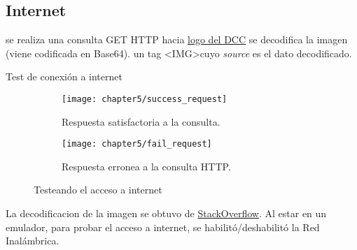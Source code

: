 \subsection*{Internet}
\begin{algorithm}
	\begin{algorithmic}[1]
		\STATE se realiza una consulta GET HTTP hacia \href{https://dcc.fceia.unr.edu.ar/sites/all/themes/birthofcool/images/logo-lcc.png}{logo del DCC}
		\STATE se decodifica la imagen (viene codificada en Base64).
		\RETURN un tag \textless IMG\textgreater cuyo \textit{source} es el dato decodificado.
	\end{algorithmic}
	\caption{Test de conexión a internet}\label{alg:chap5_test_internet}
\end{algorithm}
\begin{figure}[!ht]
	\begin{subfigure}{.45\textwidth}
	    \centering
		\texttt{[image: chapter5/success\_request]}
		\caption{Respuesta satisfactoria a la consulta.}
		\label{fig:chapter05:success_request}
	\end{subfigure}
	\begin{subfigure}{.45\textwidth}
	    \centering
		\texttt{[image: chapter5/fail\_request]}
		\caption{Respuesta erronea a la consulta HTTP.}
		\label{fig:chapter05:fail_request}
	\end{subfigure}
	\caption{Testeando el acceso a internet}
	\label{fig:chapter05:internet_test}
\end{figure}
La decodificacion de la imagen se obtuvo de \href{https://stackoverflow.com/questions/19124701/get-image-using-jquery-ajax-and-decode-it-to-base64/25371174#25371174}{StackOverflow}. Al estar en un emulador, para probar el acceso a internet, se habilitó/deshabilitó la Red Inalámbrica.\\
\newpage
